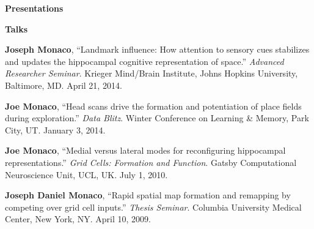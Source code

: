 \documentclass[10pt]{article}
\begin{document}
{\large \textbf{Presentations}}\nopagebreak

\begin{description}
\item \textbf{Talks}\nopagebreak
\item[\quad] \textbf{Joseph Monaco}, ``Landmark influence: How attention to sensory cues stabilizes and updates the hippocampal cognitive representation of space.'' \emph{Advanced Researcher Seminar}. Krieger Mind/Brain Institute, Johns Hopkins University, Baltimore, MD. April 21, 2014.
\item[\quad] \textbf{Joe Monaco}, ``Head scans drive the formation and potentiation of place fields during exploration.'' \emph{Data Blitz}. Winter Conference on Learning \& Memory, Park City, UT. January 3, 2014.
\item[\quad] \textbf{Joe Monaco}, ``Medial versus lateral modes for reconfiguring hippocampal representations.'' \emph{Grid Cells: Formation and Function}. Gatsby Computational Neuroscience Unit, UCL, UK. July 1, 2010.
\item[\quad] \textbf{Joseph Daniel Monaco}, ``Rapid spatial map formation and remapping by competing over grid cell inputs.'' \emph{Thesis Seminar}. Columbia University Medical Center, New York, NY. April 10, 2009.
\end{description}
\end{document}
